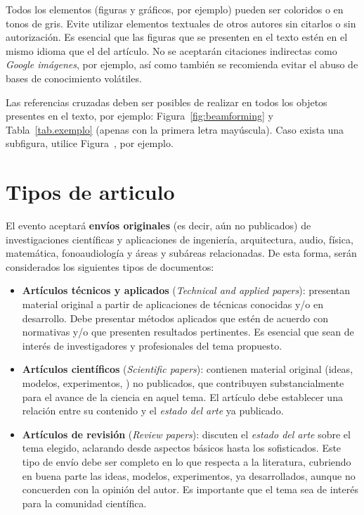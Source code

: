 \documentclass[12pt, a4paper, twoside, twocolumn]{article}
\begin{document}
Todos los elementos (figuras y gráficos, por ejemplo) pueden ser coloridos o en tonos de gris. Evite utilizar elementos textuales de otros autores sin citarlos o sin autorización. Es esencial que las figuras que se presenten en el texto estén en el mismo idioma que el del artículo. No se aceptarán citaciones indirectas como \textit{Google imágenes}, por ejemplo, así como también se recomienda evitar el abuso de bases de conocimiento volátiles.

Las referencias cruzadas deben ser posibles de realizar en todos los objetos presentes en el texto, por ejemplo: Figura~\ref{fig:beamforming} y Tabla~\ref{tab.exemplo} (apenas con la primera letra mayúscula). Caso exista una subfigura, utilice Figura~, por ejemplo.


\section{Tipos de articulo}

El evento aceptará \textbf{envíos originales} (es decir, aún no publicados) de investigaciones científicas y aplicaciones de ingeniería, arquitectura, audio, física, matemática, fonoaudiología y áreas y subáreas relacionadas. De esta forma, serán considerados los siguientes tipos de documentos:
%
\begin{itemize}[noitemsep,topsep=-1ex] \itemsep=7pt
	\item \textbf{Artículos técnicos y aplicados} (\textit{Technical and applied papers}): presentan material original a partir de aplicaciones de técnicas conocidas y/o en desarrollo. Debe presentar métodos aplicados que estén de acuerdo con normativas y/o que presenten resultados pertinentes. Es esencial que sean de interés de investigadores y profesionales del tema propuesto.
	
	\item \textbf{Artículos científicos} (\textit{Scientific papers}): 
	contienen material original (ideas, modelos, experimentos, \etc) no publicados, que contribuyen substancialmente para el avance de la ciencia en aquel tema. El artículo debe establecer una relación entre su contenido y el \textit{estado del arte} ya publicado.

	\item \textbf{Artículos de revisión} (\textit{Review papers}):
	discuten el \textit{estado del arte} sobre el tema elegido, aclarando desde aspectos básicos hasta los sofisticados. Este tipo de envío debe ser completo en lo que respecta a la literatura, cubriendo en buena parte las ideas, modelos, experimentos, \etc ya desarrollados, aunque no concuerden con la opinión del autor. Es importante que el tema sea de interés para la comunidad científica.
\end{itemize}
\end{document}
